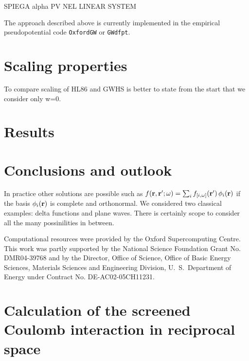 \documentclass[twocolumn,prb,showpacs,superscriptaddress]{revtex4}
\def\w{\omega}
\def\r{{\bf r}}
\def\rp{{\bf r^\prime}}
\begin{document}
SPIEGA alpha PV NEL LINEAR SYSTEM

The approach described above is currently implemented in the empirical
pseudopotential code {\tt OxfordGW} or {\tt GWdfpt}. 

\section{Scaling properties}

To compare scaling of HL86 and GWHS is better to state from the start that
we consider only w=0.

\section{Results}

\section{Conclusions and outlook}

In practice other solutions are possible such as $f(\r,\rp;\w) = \sum_i f_{[i,\w]}(\rp) \, \phi_i(\r)$
if the basis $\phi_i(\r)$ is complete and orthonormal. We considered two classical
examples: delta functions and plane waves. There is certainly scope to consider
all the many possinilities in between.

\begin{acknowledgments}
Computational resources were provided by the Oxford Supercomputing Centre.
This work was partly supported by the National Science Foundation Grant No. DMR04-39768 and by
the Director, Office of Science, Office of Basic Energy Sciences, Materials Sciences
and Engineering Division, U.\ S.\ Department of Energy under Contract No. DE-AC02-05CH11231.
\end{acknowledgments}

\appendix

\section{Calculation of the screened Coulomb interaction in reciprocal space}
\end{document}

